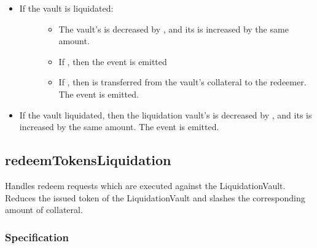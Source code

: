 \documentclass[a4paper,10pt,english]{sphinxmanual}
\begin{document}
\begin{itemize}
\item {} \begin{description}
\item[{If the vault is  liquidated:}] \leavevmode\begin{itemize}
\item {} 
The vault’s  is decreased by , and its  is increased by the same amount.

\item {} 
If , then the  event is emitted

\item {} 
If , then  is transferred from the vault’s collateral to the redeemer. The  event is emitted.

\end{itemize}

\end{description}

\item {} 
If the vault  liquidated, then the liquidation vault’s  is decreased by , and its  is increased by the same amount. The  event is emitted.

\end{itemize}


\subsection{redeemTokensLiquidation}
\label{\detokenize{spec/vault-registry:redeemtokensliquidation}}\label{\detokenize{spec/vault-registry:id27}}
Handles redeem requests which are executed against the LiquidationVault. Reduces the issued token of the LiquidationVault and slashes the
corresponding amount of collateral.


\subsubsection{Specification}
\label{\detokenize{spec/vault-registry:id28}}
\end{document}
